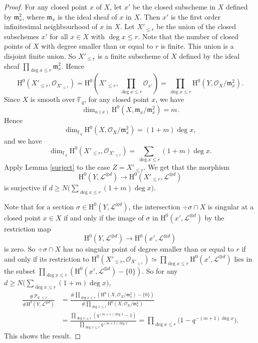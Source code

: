 \documentclass[11pt]{article}
\numberwithin{equation}{section}
\theoremstyle{plain}
\theoremstyle{definition}
\newcommand{\ho}{\mathrm{H}}
\newcommand{\li}{\mathcal{L}}
\newcommand{\F}{\mathbb{F}}
\begin{document}
\begin{proof}
For any closed point $x$ of $X$, let $x'$ be the closed subscheme in $X$ defined by $\mathfrak{m}_x^2$, where $\mathfrak{m}_x$ is the ideal sheaf of $x$ in $X$. Then $x'$ is the first order infinitesimal neighbourhood of $x$ in $X$. Let $X'_{\leq r}$ be the union of the closed subschemes $x'$ for all $x\in X$ with $\deg x\leq r$. Note that the number of closed points of $X$ with degree smaller than or equal to $r$ is finite. This union is a disjoint finite union. So $X'_{\leq r}$ is a finite subscheme of $X$ defined by the ideal sheaf $\prod_{\deg x\leq r}\mathfrak{m}_x^2$. Hence
\[
\ho^0(X'_{\leq r},\mathcal{O}_{X'_{\leq r}})=\ho^0(X'_{\leq r}, \prod_{\deg x\leq r } \mathcal{O}_{x'})=\prod_{\deg x\leq r }\ho^0(Y, \mathcal{O}_X/\mathfrak{m}_x^2).
\]
Since $X$ is smooth over $\F_q$, for any closed point $x$, we have
\[
\dim_{\kappa(x)} \ho^0(X, \mathfrak{m}_x/\mathfrak{m}_x^2)=m.
\]
Hence
\[
\dim_{\F_q} \ho^0(X, \mathcal{O}_X/\mathfrak{m}_x^2)=(1+m)\deg x,
\]
and we have
\[
\dim_{\F_q}\ho^0(X'_{\leq r},\mathcal{O}_{X'_{\leq r}})=\sum_{\deg x\leq r} (1+m)\deg x .
\]
Apply Lemma \ref{surject} to the case $Z=X'_{\leq r}$. We get that the morphism
\[
\ho^0(Y, \li^{\otimes d})\to \ho^0(X'_{\leq r}, \li^{\otimes d})
\]
is surjective if $d\geq N\bigl(\sum_{\deg x\leq r}(1+m)\deg x\bigr)$.

Note that for a section $\sigma\in \ho^0(Y, \li^{\otimes d})$, the intersection $\div \sigma\cap X$ is singular at a closed point $x\in X$ if and only if the image of $\sigma$ in $\ho^0(x', \li^{\otimes d})$ by the restriction map
\[
\ho^0(Y, \li^{\otimes d})\to \ho^0(x', \li^{\otimes d})
\]
is zero. So $\div \sigma\cap X$ has no singular point of degree smaller than or equal to $r$ if and only if its restriction to $\ho^0(X'_{\leq r},\mathcal{O}_{X'_{\leq r}})\simeq\prod_{\deg x\leq r }\ho^0(x', \li^{\otimes d})$ lies in the subset $\prod_{\deg x\leq r }\left(\ho^0(x', \li^{\otimes d})-\{0\}\right)$. So for any $d\geq N\bigl(\sum_{\deg x\leq r}(1+m)\deg x\bigr)$,
\begin{align*}
\frac{\#\mathcal{P}_{d,\leq r}}{\#\ho^0(Y, \li^{\otimes d})}&=\frac{\#\prod_{\deg x\leq r }\left(\ho^0(X, \mathcal{O}_X/\mathfrak{m}_x^2)-\{0\}\right)}{\#\prod_{\deg x\leq r }\ho^0(X, \mathcal{O}_X/\mathfrak{m}_x^2)}\\
&=\frac{\prod_{\deg x\leq r }\left(q^{(m+1)\deg x}-1\right)}{\prod_{\deg x\leq r }q^{(m+1)\deg x}}=\prod_{\deg x\leq r} \bigl(1-q^{-(m+1)\deg x} \bigr).
\end{align*}
This shows the result.
\end{proof}
\end{document}
